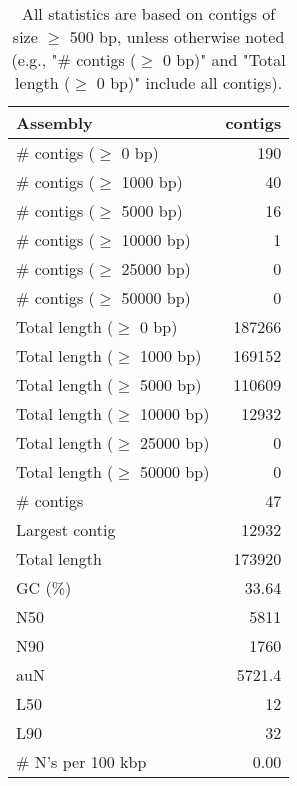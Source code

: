 \documentclass[12pt,a4paper]{article}
\begin{document}
\begin{table}[ht]
\begin{center}
\caption{All statistics are based on contigs of size $\geq$ 500 bp, unless otherwise noted (e.g., "\# contigs ($\geq$ 0 bp)" and "Total length ($\geq$ 0 bp)" include all contigs).}
\begin{tabular}{|l*{1}{|r}|}
\hline
Assembly & contigs \\ \hline
\# contigs ($\geq$ 0 bp) & 190 \\ \hline
\# contigs ($\geq$ 1000 bp) & 40 \\ \hline
\# contigs ($\geq$ 5000 bp) & 16 \\ \hline
\# contigs ($\geq$ 10000 bp) & 1 \\ \hline
\# contigs ($\geq$ 25000 bp) & 0 \\ \hline
\# contigs ($\geq$ 50000 bp) & 0 \\ \hline
Total length ($\geq$ 0 bp) & 187266 \\ \hline
Total length ($\geq$ 1000 bp) & 169152 \\ \hline
Total length ($\geq$ 5000 bp) & 110609 \\ \hline
Total length ($\geq$ 10000 bp) & 12932 \\ \hline
Total length ($\geq$ 25000 bp) & 0 \\ \hline
Total length ($\geq$ 50000 bp) & 0 \\ \hline
\# contigs & 47 \\ \hline
Largest contig & 12932 \\ \hline
Total length & 173920 \\ \hline
GC (\%) & 33.64 \\ \hline
N50 & 5811 \\ \hline
N90 & 1760 \\ \hline
auN & 5721.4 \\ \hline
L50 & 12 \\ \hline
L90 & 32 \\ \hline
\# N's per 100 kbp & 0.00 \\ \hline
\end{tabular}
\end{center}
\end{table}
\end{document}
